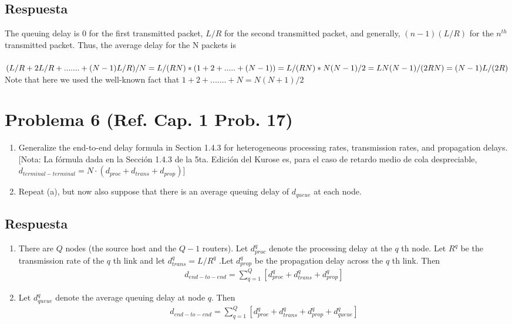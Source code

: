 \documentclass[10pt,spanish]{article}
\numberwithin{figure}{section} %
\begin{document}
\subsection*{Respuesta}

The queuing delay is 0 for the first transmitted packet, $L/R$ for the second transmitted packet, and generally, $(n-1)(L/R)$ for the $n^{th}$ transmitted packet. Thus, the average delay for the N packets is\\
 \\
$(L/R + 2L/R + ....... + (N-1)L/R)/N\\ 
= L/(RN) * (1 + 2 + ..... + (N-1))\\ 
= L/(RN) * N(N-1)/2\\
= LN(N-1)/(2RN)\\              
= (N-1)L/(2R)\\
$\\     
Note that here we used the well-known fact that $1 + 2 + ....... + N = N(N+1)/2$

\section[Problema 6]{Problema 6 \textnormal{\Large{(Ref. Cap. 1 Prob. 17)}}}

\begin{enumerate}
\item Generalize the end-to-end delay formula in Section 1.4.3 for heterogeneous processing rates, transmission rates, and propagation delays.
[Nota: La fórmula dada en la Sección 1.4.3 de la 5ta. Edición del Kurose  es, para el caso de retardo medio de cola despreciable, $d_{terminal-terminal} = N \cdot (d_{proc} + d_{trans} + d_{prop})$]
\item Repeat (a), but now also suppose that there is an average queuing delay of $d_{queue}$ at each node.
\end{enumerate}

\subsection*{Respuesta}
\begin{enumerate}
\item There are $Q$ nodes (the source host and the $Q-1$ routers). Let $d_{proc}^{q}$ denote the processing delay at the $q$ th node. Let $R^q$ be the transmission rate of the $q$ th link and let $d^q_{trans} = L/R^q$ .Let $d_{prop}^q$ be the propagation delay across the $q$ th link. Then
\begin{align*}
\displaystyle d_{end-to-end} = \sum^Q_{q=1} \left[ d^q_{proc} + d^q_{trans} + d^q_{prop} \right]
\end{align*}
\item Let $d^q_{queue}$ denote the average queuing delay at node $q$. Then
\begin{align*}
\displaystyle d_{end-to-end} = \sum^Q_{q=1} \left[ d^q_{proc} + d^q_{trans} + d^q_{prop} + d^q_{queue} \right]
\end{align*}

\end{enumerate}
\end{document}
